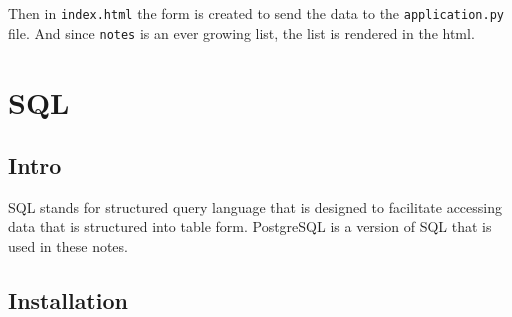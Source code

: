 \documentclass[]{book}
\newenvironment{Shaded}{\begin{snugshade}}{\end{snugshade}}
\newcommand{\StringTok}[1]{\textcolor[rgb]{0.31,0.60,0.02}{#1}}
\newcommand{\OperatorTok}[1]{\textcolor[rgb]{0.81,0.36,0.00}{\textbf{#1}}}
\newcommand{\ExtensionTok}[1]{#1}
\newcommand{\NormalTok}[1]{#1}
\begin{document}
Then in \texttt{index.html} the form is created to send the data to the
\texttt{application.py} file. And since \texttt{notes} is an ever
growing list, the list is rendered in the html.

\begin{Shaded}
\end{Shaded}

\chapter{SQL}\label{sql}

\section{Intro}\label{intro-2}

SQL stands for structured query language that is designed to facilitate
accessing data that is structured into table form. PostgreSQL is a
version of SQL that is used in these notes.

\section{Installation}\label{installation}
\end{document}
